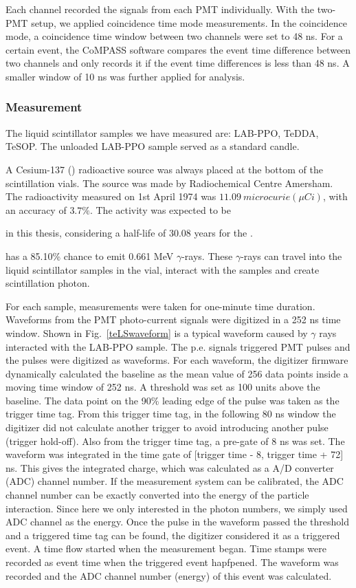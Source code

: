 Each channel recorded the signals from each PMT individually. With the two-PMT setup, we applied coincidence time mode measurements. In the coincidence mode, a coincidence time window between two channels were set to 48 ns. For a certain event, the CoMPASS software compares the event time difference between two channels and only records it if the event time differences is less than 48 ns. A smaller window of 10 ns was further applied for analysis.

\subsubsection{Measurement}

The liquid scintillator samples we have measured are: LAB-PPO, TeDDA, TeSOP. The unloaded LAB-PPO sample served as a standard candle. 

A Cesium-137 () radioactive source was always placed at the bottom of the scintillation vials.
The source was made by Radiochemical Centre Amersham. The radioactivity measured on 1st April 1974 was $11.09~microcurie(\mu Ci)$, with an accuracy of $3.7\%$. The activity was expected to be 

in this thesis, considering a half-life of 30.08 years for the \cite{nndc}.

has a 85.10\% chance to emit 0.661 MeV $\gamma$-rays\cite{nndc}. These $\gamma$-rays can travel into the liquid scintillator samples in the vial, interact with the samples and create scintillation photon.

For each sample, measurements were taken for one-minute time duration. Waveforms from the PMT photo-current signals were digitized in a 252 ns time window. Shown in Fig.~\ref{teLSwaveform} is a typical waveform caused by $\gamma$ rays interacted with the LAB-PPO sample. The p.e. signals triggered PMT pulses and the pulses were digitized as waveforms. For each waveform, the digitizer firmware dynamically calculated the baseline as the mean value of 256 data points inside a moving time window of 252 ns. A threshold was set as 100 units above the baseline. The data point on the 90\% leading edge of the pulse was taken as the trigger time tag. From this trigger time tag, in the following 80 ns window the digitizer did not calculate another trigger to avoid introducing another pulse (trigger hold-off). Also from the trigger time tag, a pre-gate of 8 ns was set. The waveform was integrated in the time gate of  [trigger time - 8,  trigger time + 72] ns. This gives the integrated charge, which was calculated as a A/D converter (ADC) channel number. If the measurement system can be calibrated, the ADC channel number can be exactly converted into the energy of the particle interaction. Since here we only interested in the photon numbers, we simply used ADC channel as the energy. Once the pulse in the waveform passed the threshold and a triggered time tag can be found, the digitizer considered it as a triggered event. A time flow started when the measurement began. Time stamps were recorded as event time when the triggered event hapfpened. The waveform was recorded and the ADC channel number (energy) of this event was calculated.

